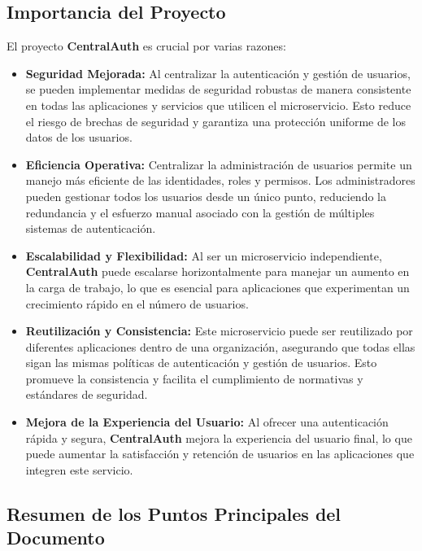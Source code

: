 \documentclass{article}
\begin{document}
\subsection{Importancia del Proyecto}

El proyecto \textbf{CentralAuth} es crucial por varias razones:

\begin{itemize}
    \item \textbf{Seguridad Mejorada:} Al centralizar la autenticación y gestión de usuarios, se pueden implementar medidas de seguridad robustas de manera consistente en todas las aplicaciones y servicios que utilicen el microservicio. Esto reduce el riesgo de brechas de seguridad y garantiza una protección uniforme de los datos de los usuarios.
    \item \textbf{Eficiencia Operativa:} Centralizar la administración de usuarios permite un manejo más eficiente de las identidades, roles y permisos. Los administradores pueden gestionar todos los usuarios desde un único punto, reduciendo la redundancia y el esfuerzo manual asociado con la gestión de múltiples sistemas de autenticación.
    \item \textbf{Escalabilidad y Flexibilidad:} Al ser un microservicio independiente, \textbf{CentralAuth} puede escalarse horizontalmente para manejar un aumento en la carga de trabajo, lo que es esencial para aplicaciones que experimentan un crecimiento rápido en el número de usuarios.
    \item \textbf{Reutilización y Consistencia:} Este microservicio puede ser reutilizado por diferentes aplicaciones dentro de una organización, asegurando que todas ellas sigan las mismas políticas de autenticación y gestión de usuarios. Esto promueve la consistencia y facilita el cumplimiento de normativas y estándares de seguridad.
    \item \textbf{Mejora de la Experiencia del Usuario:} Al ofrecer una autenticación rápida y segura, \textbf{CentralAuth} mejora la experiencia del usuario final, lo que puede aumentar la satisfacción y retención de usuarios en las aplicaciones que integren este servicio.
\end{itemize}

\subsection{Resumen de los Puntos Principales del Documento}
\end{document}
